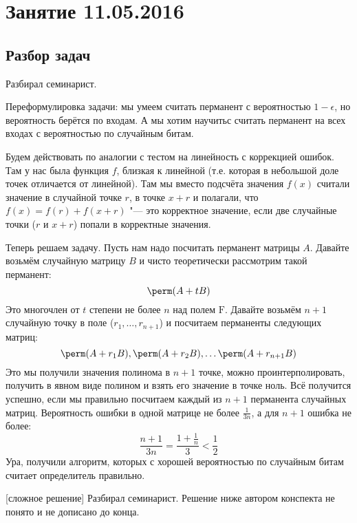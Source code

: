 \chapter{Занятие 11.05.2016}

\section{Разбор задач}
	Разбирал семинарист.

	Переформулировка задачи: мы умеем считать перманент с вероятностью $1-\epsilon$,
	но вероятность берётся по входам.
	А мы хотим научитьс считать перманент на всех входах с вероятностью по случайным битам.

	\begin{Rem}
		Будем действовать по аналогии с тестом на линейность с коррекцией ошибок.
		Там у нас была функция $f$, близкая к линейной (т.е. которая в небольшой доле точек
		отличается от линейной).
		Там мы вместо подсчёта значения $f(x)$ считали значение в случайной точке $r$,
		в точке $x+r$ и полагали, что $f(x)=f(r)+f(x+r)$ "--- это корректное значение,
		если две случайные точки ($r$ и $x+r$) попали в корректные значения.
	\end{Rem}

	Теперь решаем задачу.
	Пусть нам надо посчитать перманент матрицы $A$.
	Давайте возьмём случайную матрицу $B$ и чисто теоретически рассмотрим такой перманент:
	\[ \perm(A + tB) \]
	Это многочлен от $t$ степени не более $n$ над полем $\mathrm{F}$.
	Давайте возьмём $n+1$ случайную точку в поле ($r_1, \dots, r_{n+1}$) и посчитаем перманенты следующих матриц:
	\[
		\perm(A + r_1B),
		\perm(A + r_2B),
		\dots
		\perm(A + r_{n+1}B)
	\]
	Это мы получили значения полинома в $n+1$ точке, можно проинтерполировать, получить в явном виде
	полином и взять его значение в точке ноль.
	Всё получится успешно, если мы правильно посчитаем каждый из $n+1$ перманента случайных матриц.
	Вероятность ошибки в одной матрице не более $\frac{1}{3n}$, а для $n+1$ ошибка не более:
	\[
		\frac{n+1}{3n} = \frac{1+\frac1n}{3} < \frac12
	\]
	Ура, получили алгоритм, которых с хорошей вероятностью по случайным битам считает определитель правильно.

[сложное решение]
	Разбирал семинарист.
	Решение ниже автором конспекта не понято и не дописано до конца.

